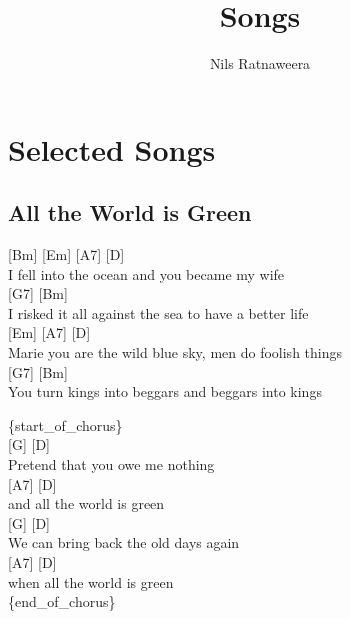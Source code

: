 \documentclass[
  letterpaper,
  DIV=11,
  numbers=noendperiod]{scrreprt}
\title{Songs}
\author{Nils Ratnaweera}
\date{}
\renewcommand*\contentsname{Table of contents}
\newcommand\contentsname{Table of contents}
\begin{document}
\maketitle
\ifdefined\Shaded\renewenvironment{Shaded}{\begin{tcolorbox}[interior hidden, breakable, sharp corners, boxrule=0pt, frame hidden, enhanced, borderline west={3pt}{0pt}{shadecolor}]}{\end{tcolorbox}}\fi

\renewcommand*\contentsname{Table of contents}
{
\hypersetup{linkcolor=}
\setcounter{tocdepth}{2}
\tableofcontents
}

\hypertarget{section}{%
\chapter{}\label{section}}

\part{Selected Songs}

\hypertarget{all-the-world-is-green}{%
\chapter{All the World is Green}\label{all-the-world-is-green}}

{[}Bm{]} {[}Em{]} {[}A7{]} {[}D{]}\\
I fell into the ocean and you became my wife\\
{[}G7{]} {[}Bm{]}\\
I risked it all against the sea to have a better life\\
{[}Em{]} {[}A7{]} {[}D{]}\\
Marie you are the wild blue sky, men do foolish things\\
{[}G7{]} {[}Bm{]}\\
You turn kings into beggars and beggars into kings

\{start\_of\_chorus\}\\
{[}G{]} {[}D{]}\\
Pretend that you owe me nothing\\
{[}A7{]} {[}D{]}\\
and all the world is green\\
{[}G{]} {[}D{]}\\
We can bring back the old days again\\
{[}A7{]} {[}D{]}\\
when all the world is green\\
\{end\_of\_chorus\}
\end{document}
